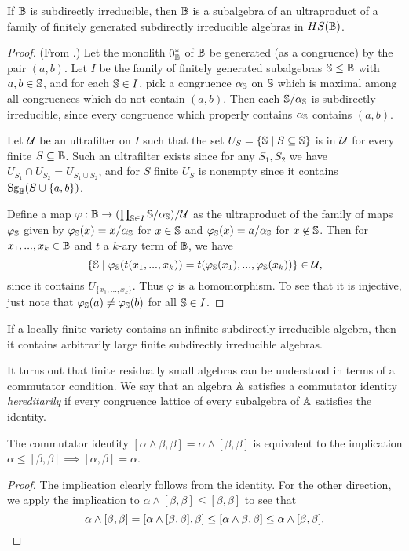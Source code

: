 \documentclass[letterpaper,11pt]{article}
\DeclareMathOperator{\Sg}{Sg}
\begin{document}
\begin{thm}\label{ultraproduct-fin-gen} If $\mathbb{B}$ is subdirectly irreducible, then $\mathbb{B}$ is a subalgebra of an ultraproduct of a family of finitely generated subdirectly irreducible algebras in $HS(\mathbb{B})$.
\end{thm}
\begin{proof} (From \cite{commutator-theory}.) Let the monolith $0_{\mathbb{B}}^*$ of $\mathbb{B}$ be generated (as a congruence) by the pair $(a,b)$. Let $I$ be the family of finitely generated subalgebras $\mathbb{S} \le \mathbb{B}$ with $a,b \in \mathbb{S}$, and for each $\mathbb{S} \in I$, pick a congruence $\alpha_{\mathbb{S}}$ on $\mathbb{S}$ which is maximal among all congruences which do not contain $(a,b)$. Then each $\mathbb{S}/\alpha_{\mathbb{S}}$ is subdirectly irreducible, since every congruence which properly contains $\alpha_{\mathbb{S}}$ contains $(a,b)$.

Let $\mathcal{U}$ be an ultrafilter on $I$ such that the set $U_S = \{\mathbb{S} \mid S \subseteq \mathbb{S}\}$ is in $\mathcal{U}$ for every finite $S \subseteq \mathbb{B}$. Such an ultrafilter exists since for any $S_1, S_2$ we have $U_{S_1} \cap U_{S_2} = U_{S_1\cup S_2}$, and for $S$ finite $U_S$ is nonempty since it contains $\Sg_\bB(S \cup \{a,b\})$.

Define a map $\varphi : \mathbb{B} \rightarrow (\prod_{\mathbb{S} \in I} \mathbb{S}/\alpha_{\mathbb{S}})/\mathcal{U}$ as the ultraproduct of the family of maps $\varphi_{\mathbb{S}}$ given by $\varphi_{\mathbb{S}}(x) = x/\alpha_{\mathbb{S}}$ for $x \in \mathbb{S}$ and $\varphi_{\mathbb{S}}(x) = a/\alpha_{\mathbb{S}}$ for $x \not\in \mathbb{S}$. Then for $x_1, ..., x_k \in \mathbb{B}$ and $t$ a $k$-ary term of $\mathbb{B}$, we have
\[
\{\mathbb{S} \mid \varphi_{\mathbb{S}}(t(x_1, ..., x_k)) = t(\varphi_{\mathbb{S}}(x_1), ..., \varphi_{\mathbb{S}}(x_k))\} \in \mathcal{U},
\]
since it contains $U_{\{x_1, ..., x_k\}}$. Thus $\varphi$ is a homomorphism. To see that it is injective, just note that $\varphi_{\mathbb{S}}(a) \ne \varphi_{\mathbb{S}}(b)$ for all $\mathbb{S} \in I$.
\end{proof}

\begin{cor}\label{residually-infinite} If a locally finite variety contains an infinite subdirectly irreducible algebra, then it contains arbitrarily large finite subdirectly irreducible algebras.
\end{cor}

It turns out that finite residually small algebras can be understood in terms of a commutator condition. We say that an algebra $\mathbb{A}$ satisfies a commutator identity \emph{hereditarily} if every congruence lattice of every subalgebra of $\mathbb{A}$ satisfies the identity.

\begin{prop} The commutator identity $[\alpha \wedge \beta, \beta] = \alpha \wedge [\beta,\beta]$ is equivalent to the implication $\alpha \le [\beta,\beta] \implies [\alpha,\beta] = \alpha$.
\end{prop}
\begin{proof} The implication clearly follows from the identity. For the other direction, we apply the implication to $\alpha \wedge [\beta,\beta] \le [\beta,\beta]$ to see that
\[
\alpha \wedge [\beta,\beta] = [\alpha \wedge [\beta,\beta], \beta] \le [\alpha\wedge \beta,\beta] \le \alpha \wedge [\beta,\beta].\qedhere
\]
\end{proof}
\end{document}
